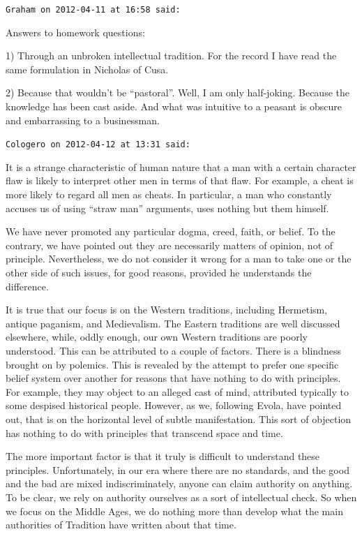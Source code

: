 \begin{footnotesize}
\begin{sffamily}
\hfill

\texttt{Graham on 2012-04-11 at 16:58 said:}

Answers to homework questions:

1) Through an unbroken intellectual tradition. For the record I have read the same formulation in Nicholas of Cusa.

2) Because that wouldn't be ``pastoral''. Well, I am only half-joking. Because the knowledge has been cast aside. And what was intuitive to a peasant is obscure and embarrassing to a businessman.

\hfill

\texttt{Cologero on 2012-04-12 at 13:31 said:}

It is a strange characteristic of human nature that a man with a certain character flaw is likely to interpret other men in terms of that flaw. For example, a cheat is more likely to regard all men as cheats. In particular, a man who constantly accuses us of using ``straw man'' arguments, uses nothing but them himself.

We have never promoted any particular dogma, creed, faith, or belief. To the contrary, we have pointed out they are necessarily matters of opinion, not of principle. Nevertheless, we do not consider it wrong for a man to take one or the other side of such issues, for good reasons, provided he understands the difference.

It is true that our focus is on the Western traditions, including Hermetism, antique paganism, and Medievalism. The Eastern traditions are well discussed elsewhere, while, oddly enough, our own Western traditions are poorly understood. This can be attributed to a couple of factors. There is a blindness brought on by polemics. This is revealed by the attempt to prefer one specific belief system over another for reasons that have nothing to do with principles. For example, they may object to an alleged cast of mind, attributed typically to some despised historical people. However, as we, following Evola, have pointed out, that is on the horizontal level of subtle manifestation. This sort of objection has nothing to do with principles that transcend space and time.

The more important factor is that it truly is difficult to understand these principles. Unfortunately, in our era where there are no standards, and the good and the bad are mixed indiscriminately, anyone can claim authority on anything. To be clear, we rely on authority ourselves as a sort of intellectual check. So when we focus on the Middle Ages, we do nothing more than develop what the main authorities of Tradition have written about that time.


\end{sffamily}
\end{footnotesize}
